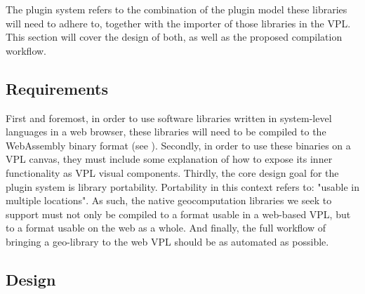 The plugin system refers to the combination of the plugin model these libraries will need to adhere to, together with the importer of those libraries in the VPL. 
This section will cover the design of both, as well as the proposed compilation workflow.





\subsection{Requirements}

First and foremost, in order to use software libraries written in system-level languages in a web browser, these libraries will need to be compiled to the WebAssembly binary format (see ). 
Secondly, in order to use these binaries on a VPL canvas, they must include some explanation of how to expose its inner functionality as VPL visual components.
Thirdly, the core design goal for the plugin system is library portability.
Portability in this context refers to: "usable in multiple locations".
As such, the native geocomputation libraries we seek to support must not only be compiled to a format usable in a web-based VPL, but to a format usable on the web as a whole. 
And finally, the full workflow of bringing a geo-library to the web VPL should be as automated as possible. 

\newpage
\subsection{Design}

